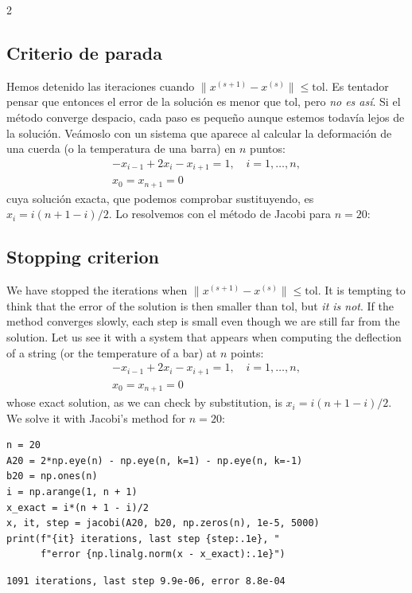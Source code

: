 \begin{paracol}{2}
\subsection{Criterio de parada}\label{sec:parada_it}
Hemos detenido las iteraciones cuando $\lVert x^{(s+1)}-x^{(s)}\rVert\leq\text{tol}$. Es tentador pensar que entonces el error de la solución es menor que $\text{tol}$, pero \emph{no es así}. Si el método converge despacio, cada paso es pequeño aunque estemos todavía lejos de la solución. Veámoslo con un sistema que aparece al calcular la deformación de una cuerda (o la temperatura de una barra) en $n$ puntos:
\begin{gather*}
-x_{i-1}+2x_i-x_{i+1}=1,\quad i=1,\dots,n,\\
x_0=x_{n+1}=0
\end{gather*}
cuya solución exacta, que podemos comprobar sustituyendo, es $x_i=i(n+1-i)/2$. Lo resolvemos con el método de Jacobi para $n=20$:

\switchcolumn
\subsection{Stopping criterion}\label{sec:parada_it-2}
We have stopped the iterations when $\lVert x^{(s+1)}-x^{(s)}\rVert\leq\text{tol}$. It is tempting to think that the error of the solution is then smaller than $\text{tol}$, but \emph{it is not}. If the method converges slowly, each step is small even though we are still far from the solution. Let us see it with a system that appears when computing the deflection of a string (or the temperature of a bar) at $n$ points:
\begin{gather*}
-x_{i-1}+2x_i-x_{i+1}=1,\quad i=1,\dots,n,\\
x_0=x_{n+1}=0
\end{gather*}
whose exact solution, as we can check by substitution, is $x_i=i(n+1-i)/2$. We solve it with Jacobi's method for $n=20$:
\end{paracol}

\begin{verbatim}
n = 20
A20 = 2*np.eye(n) - np.eye(n, k=1) - np.eye(n, k=-1)
b20 = np.ones(n)
i = np.arange(1, n + 1)
x_exact = i*(n + 1 - i)/2
x, it, step = jacobi(A20, b20, np.zeros(n), 1e-5, 5000)
print(f"{it} iterations, last step {step:.1e}, "
      f"error {np.linalg.norm(x - x_exact):.1e}")
\end{verbatim}
\begin{verbatim}
1091 iterations, last step 9.9e-06, error 8.8e-04
\end{verbatim}

